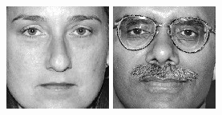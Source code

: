 \begin{figure}[ht]
\begin{center}
  \includegraphics[width=\columnwidth/10]{ch5/figures/feret33.jpg}
  \includegraphics[width=\columnwidth/10]{ch5/figures/feret34.jpg}

\end{center}
\end{figure}
